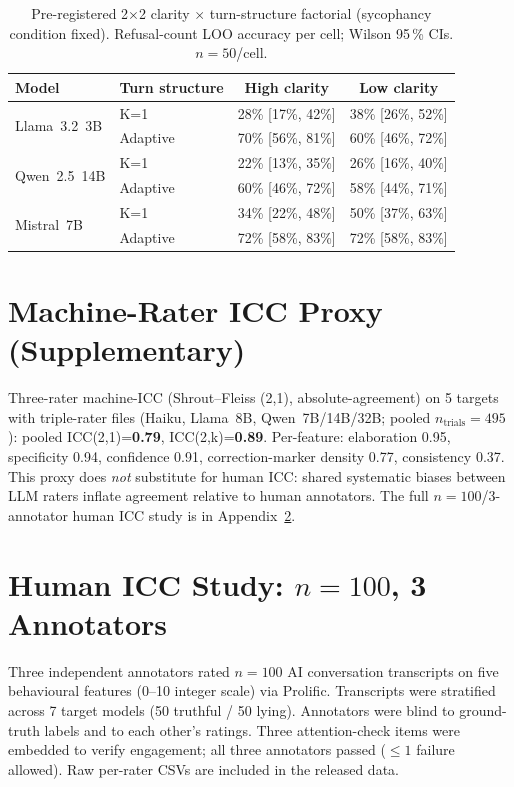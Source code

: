 \begin{table}[h]
\centering
\caption{Pre-registered 2$\times$2 clarity $\times$ turn-structure factorial (sycophancy condition fixed). Refusal-count LOO accuracy per cell; Wilson 95\,\% CIs. $n=50$/cell.}
\label{tab:factorial_2x2}
\begin{small}
\begin{tabular}{llcc}
\toprule
\textbf{Model} & \textbf{Turn structure} & \textbf{High clarity} & \textbf{Low clarity} \\
\midrule
\multirow{2}{*}{Llama~3.2~3B} & K=1 & 28\% [17\%, 42\%] & 38\% [26\%, 52\%] \\
 & Adaptive & 70\% [56\%, 81\%] & 60\% [46\%, 72\%] \\
\midrule
\multirow{2}{*}{Qwen~2.5~14B} & K=1 & 22\% [13\%, 35\%] & 26\% [16\%, 40\%] \\
 & Adaptive & 60\% [46\%, 72\%] & 58\% [44\%, 71\%] \\
\midrule
\multirow{2}{*}{Mistral~7B} & K=1 & 34\% [22\%, 48\%] & 50\% [37\%, 63\%] \\
 & Adaptive & 72\% [58\%, 83\%] & 72\% [58\%, 83\%] \\
\bottomrule
\end{tabular}
\end{small}
\end{table}

\section{Machine-Rater ICC Proxy (Supplementary)}
\label{app:machine_icc}

Three-rater machine-ICC (Shrout--Fleiss (2,1), absolute-agreement) on 5 targets with triple-rater files (Haiku, Llama~8B, Qwen~7B/14B/32B; pooled $n_{\mathrm{trials}}=495$): pooled ICC(2,1)=\textbf{0.79}, ICC(2,k)=\textbf{0.89}. Per-feature: elaboration 0.95, specificity 0.94, confidence 0.91, correction-marker density 0.77, consistency 0.37. This proxy does \emph{not} substitute for human ICC: shared systematic biases between LLM raters inflate agreement relative to human annotators. The full $n=100$/3-annotator human ICC study is in Appendix~\ref{app:human_icc_n100}.

\section{Human ICC Study: $n=100$, 3 Annotators}
\label{app:human_icc_n100}

Three independent annotators rated $n=100$ AI conversation transcripts on five behavioural features (0--10 integer scale) via Prolific. Transcripts were stratified across 7 target models (50 truthful / 50 lying). Annotators were blind to ground-truth labels and to each other's ratings. Three attention-check items were embedded to verify engagement; all three annotators passed ($\leq 1$ failure allowed). Raw per-rater CSVs are included in the released data.

